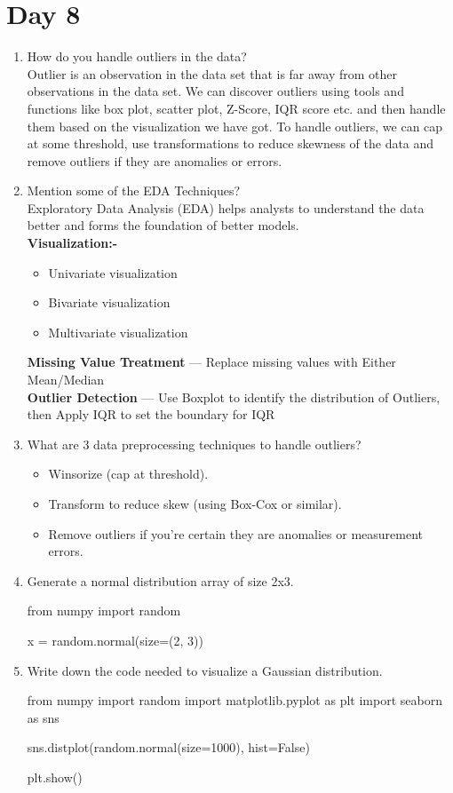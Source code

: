 \documentclass[11pt]{article}
\begin{document}
\section{Day 8}
\begin{enumerate}
\item How do you handle outliers in the data?\\[.5em]
Outlier is an observation in the data set that is far away from other observations in the data set.
We can discover outliers using tools and functions like box plot, scatter plot, Z-Score, IQR score
etc. and then handle them based on the visualization we have got. To handle outliers, we can
cap at some threshold, use transformations to reduce skewness of the data and remove outliers
if they are anomalies or errors.

\item Mention some of the EDA Techniques?\\[.5em]
Exploratory Data Analysis (EDA) helps analysts to understand the data better and forms the
foundation of better models.\\
\textbf{Visualization:-}
\begin{itemize}
\item Univariate visualization
\item Bivariate visualization
\item Multivariate visualization
\end{itemize}
\textbf{Missing Value Treatment} — Replace missing values with Either Mean/Median\\
\textbf{Outlier Detection} — Use Boxplot to identify the distribution of Outliers, then Apply IQR to set the
boundary for IQR

\item What are 3 data preprocessing techniques to handle outliers?
\begin{itemize}
\item Winsorize (cap at threshold).
\item Transform to reduce skew (using Box-Cox or similar).
\item Remove outliers if you're certain they are anomalies or measurement errors.
\end{itemize}

\item Generate a normal distribution array of size 2x3.\\[.5em]
\begin{python}
from numpy import random

x = random.normal(size=(2, 3))
\end{python}

\item Write down the code needed to visualize a Gaussian distribution.\\[.5em]
\begin{python}
from numpy import random
import matplotlib.pyplot as plt
import seaborn as sns

sns.distplot(random.normal(size=1000), hist=False)

plt.show()
\end{python}
\end{enumerate}
\pagebreak
\end{document}
